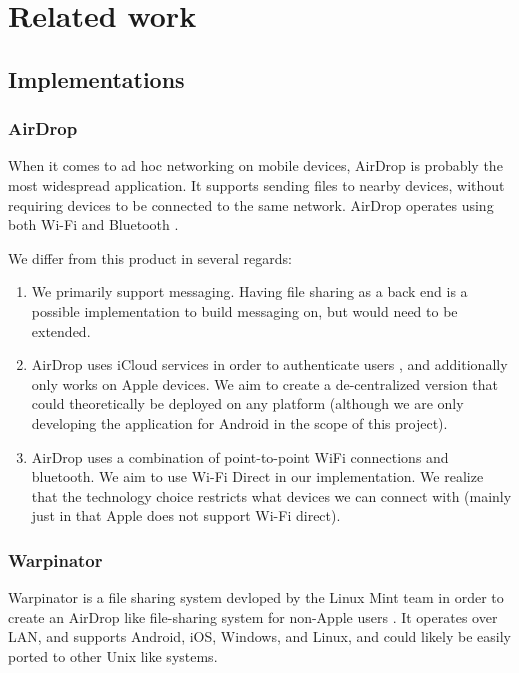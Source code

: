 \documentclass[10pt]{article}
\begin{document}
\newpage

\section{Related work}

\subsection{Implementations}

\subsubsection{AirDrop}

When it comes to ad hoc networking on mobile devices, AirDrop is probably the most widespread application. It supports sending files to nearby devices, without requiring devices to be connected to the same network. AirDrop operates using both Wi-Fi and Bluetooth \cite{AppleSupport}.

We differ from this product in several regards:

\begin{enumerate}
    \item We primarily support messaging. Having file sharing as a back end is a possible implementation to build messaging on, but would need to be extended.
    \item AirDrop uses iCloud services in order to authenticate users \cite{AppleSupportSecurity}, and additionally only works on Apple devices. We aim to create a de-centralized version that could theoretically be deployed on any platform (although we are only developing the application for Android in the scope of this project).
    \item AirDrop uses a combination of point-to-point WiFi connections and bluetooth. We aim to use Wi-Fi Direct in our implementation. We realize that the technology choice restricts what devices we can connect with (mainly just in that Apple does not support Wi-Fi direct).
\end{enumerate}

\subsubsection{Warpinator}

Warpinator is a file sharing system devloped by the Linux Mint team in order to create an AirDrop like file-sharing system for non-Apple users  \cite{Webster2023linuxmint}. It operates over LAN, and supports Android, iOS, Windows, and Linux, and could likely be easily ported to other Unix like systems.
\end{document}

